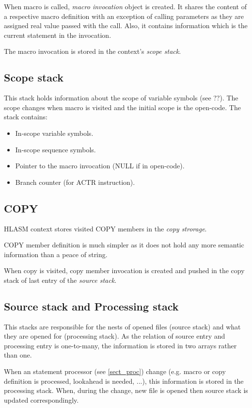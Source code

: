 When macro is called, \emph{macro invocation} object is created. It shares the content of a respective macro definition with an exception of calling parameters as they are assigned real value passed with the call. Also, it contains information which is the current statement in the invocation.

The macro invocation is stored in the context's \emph{scope stack}.

\subsection{Scope stack}

This stack holds information about the scope of variable symbols (see ??). The scope changes when macro is visited and the initial scope is the open-code. 
The stack contains:
\begin{itemize}
	\item In-scope variable symbols.
	\item In-scope sequence symbols.
	\item Pointer to the macro invocation (NULL if in open-code).
	\item Branch counter (for ACTR instruction).
\end{itemize}

\subsection{COPY}

HLASM context stores visited COPY members in the \emph{copy strorage}.

COPY member definition is much simpler as it does not hold any more semantic information than a peace of string.

When copy is visited, copy member invocation is created and pushed in the copy stack of last entry of the \emph{source stack}.

\subsection{Source stack and Processing stack}

This stacks are responsible for the nests of opened files (source stack) and what they are opened for (processing stack). As the relation of source entry and processing entry is one-to-many, the information is stored in two arrays rather than one.

When an statement processor (see \cref{sect_proc}) change (e.g. macro or copy definition is processed, lookahead is needed, ...), this information is stored in the processing stack. When, during the change, new file is opened then source stack is updated correspondingly.

